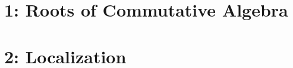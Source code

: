\documentclass[10pt]{report}
\begin{document}
\chapter*{1: Roots of Commutative Algebra}



 
%
%
%
%
%

\chapter*{2: Localization}
%
%
%
\end{document}
